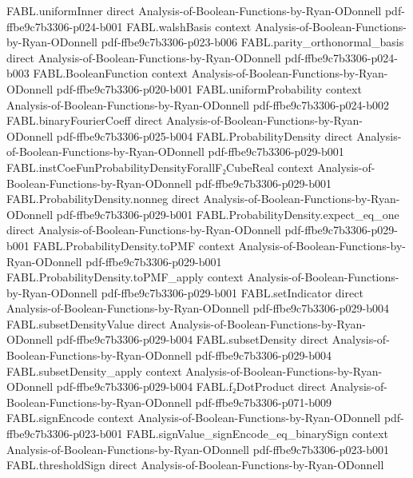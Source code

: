 \begin{theorem}
  {FABL.uniformInner}
  {direct}
  {Analysis-of-Boolean-Functions-by-Ryan-ODonnell}
  {pdf-ffbe9c7b3306-p024-b001}
\proofstep
  {FABL.walshBasis}
  {context}
  {Analysis-of-Boolean-Functions-by-Ryan-ODonnell}
  {pdf-ffbe9c7b3306-p023-b006}
\proofstep
  {FABL.parity_orthonormal_basis}
  {direct}
  {Analysis-of-Boolean-Functions-by-Ryan-ODonnell}
  {pdf-ffbe9c7b3306-p024-b003}
\proofstep
  {FABL.BooleanFunction}
  {context}
  {Analysis-of-Boolean-Functions-by-Ryan-ODonnell}
  {pdf-ffbe9c7b3306-p020-b001}
\proofstep
  {FABL.uniformProbability}
  {context}
  {Analysis-of-Boolean-Functions-by-Ryan-ODonnell}
  {pdf-ffbe9c7b3306-p024-b002}
\proofstep
  {FABL.binaryFourierCoeff}
  {direct}
  {Analysis-of-Boolean-Functions-by-Ryan-ODonnell}
  {pdf-ffbe9c7b3306-p025-b004}
\proofstep
  {FABL.ProbabilityDensity}
  {direct}
  {Analysis-of-Boolean-Functions-by-Ryan-ODonnell}
  {pdf-ffbe9c7b3306-p029-b001}
\proofstep
  {FABL.instCoeFunProbabilityDensityForallF₂CubeReal}
  {context}
  {Analysis-of-Boolean-Functions-by-Ryan-ODonnell}
  {pdf-ffbe9c7b3306-p029-b001}
\proofstep
  {FABL.ProbabilityDensity.nonneg}
  {direct}
  {Analysis-of-Boolean-Functions-by-Ryan-ODonnell}
  {pdf-ffbe9c7b3306-p029-b001}
\proofstep
  {FABL.ProbabilityDensity.expect_eq_one}
  {direct}
  {Analysis-of-Boolean-Functions-by-Ryan-ODonnell}
  {pdf-ffbe9c7b3306-p029-b001}
\proofstep
  {FABL.ProbabilityDensity.toPMF}
  {context}
  {Analysis-of-Boolean-Functions-by-Ryan-ODonnell}
  {pdf-ffbe9c7b3306-p029-b001}
\proofstep
  {FABL.ProbabilityDensity.toPMF_apply}
  {context}
  {Analysis-of-Boolean-Functions-by-Ryan-ODonnell}
  {pdf-ffbe9c7b3306-p029-b001}
\proofstep
  {FABL.setIndicator}
  {direct}
  {Analysis-of-Boolean-Functions-by-Ryan-ODonnell}
  {pdf-ffbe9c7b3306-p029-b004}
\proofstep
  {FABL.subsetDensityValue}
  {direct}
  {Analysis-of-Boolean-Functions-by-Ryan-ODonnell}
  {pdf-ffbe9c7b3306-p029-b004}
\proofstep
  {FABL.subsetDensity}
  {direct}
  {Analysis-of-Boolean-Functions-by-Ryan-ODonnell}
  {pdf-ffbe9c7b3306-p029-b004}
\proofstep
  {FABL.subsetDensity_apply}
  {context}
  {Analysis-of-Boolean-Functions-by-Ryan-ODonnell}
  {pdf-ffbe9c7b3306-p029-b004}
\proofstep
  {FABL.f₂DotProduct}
  {direct}
  {Analysis-of-Boolean-Functions-by-Ryan-ODonnell}
  {pdf-ffbe9c7b3306-p071-b009}
\proofstep
  {FABL.signEncode}
  {context}
  {Analysis-of-Boolean-Functions-by-Ryan-ODonnell}
  {pdf-ffbe9c7b3306-p023-b001}
\proofstep
  {FABL.signValue_signEncode_eq_binarySign}
  {context}
  {Analysis-of-Boolean-Functions-by-Ryan-ODonnell}
  {pdf-ffbe9c7b3306-p023-b001}
\proofstep
  {FABL.thresholdSign}
  {direct}
  {Analysis-of-Boolean-Functions-by-Ryan-ODonnell}

\end{theorem}
